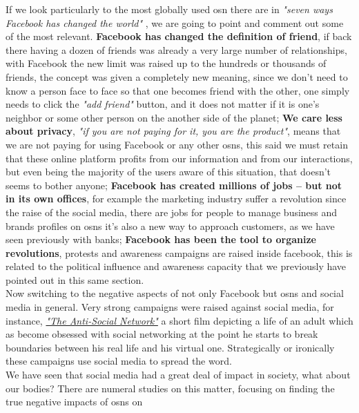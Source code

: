 \indent If we look particularly to the most globally used \gls{osn} there are in \textit{"seven ways Facebook has changed the world"} \citep{relrevfacebook}, we are going to point and comment out some of the most relevant. \textbf{Facebook has changed the definition of friend}, if back there having a dozen of friends was already a very large number of relationships, with Facebook the new limit was raised up to the hundreds or thousands of friends, the concept was given a completely new meaning, since we don't need to know a person face to face so that one becomes friend with the other, one simply needs to click the \textit{"add friend"} button, and it does not matter if it is one's neighbor or some other person on the another side of the planet; \textbf{We care less about privacy}, \textit{"if you are not paying for it, you are the product"}, means that we are not paying for using Facebook or any other \glspl{osn}, this said we must retain that these online platform profits from our information and from our interactions, but even being the majority of the users aware of this situation, that doesn't seems to bother anyone; \textbf{Facebook has created millions of jobs – but not in its own offices}, for example the marketing industry suffer a revolution since the raise of the social media, there are jobs for people to manage business and brands profiles on \glspl{osn} it's also a new way to approach customers, as we have seen previously with banks; \textbf{Facebook has been the tool to organize revolutions}, protests and awareness campaigns are raised inside facebook, this is related to the political influence and awareness capacity that we previously have pointed out in this same section.\\
\indent Now switching to the negative aspects of not only Facebook but \glspl{osn} and social media in general. Very strong campaigns were raised against social media, for instance, \href{http://www.imdb.com/title/tt3333168/}{\textit{"The Anti-Social Network"}} a short film depicting a life of an adult which as become obsessed with social networking at the point he starts to break boundaries between his real life and his virtual one. Strategically or ironically these campaigns use social media to spread the word.\\
\indent We have seen that social media had a great deal of impact in society, what about our bodies?  There are numeral studies on this matter, focusing on finding the true negative impacts of \glspl{osn} on

